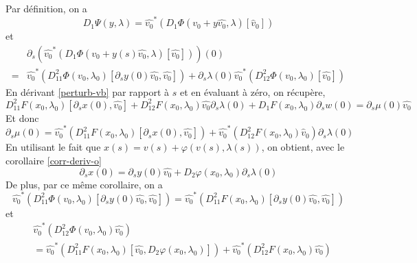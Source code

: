 \documentclass[memoire.tex]{subfiles}
\begin{document}
\begin{preuve}
    Par définition, on a
    \begin{equation*}
        D_1\Psi(y,\lambda)=\hat{v_0}^*(D_1\Phi(v_0+y\hat{v_0},\lambda)[\hat{v}_0])
    \end{equation*}
    et
    \begin{equation}\label{eq-dyn-1}    
        \begin{aligned}
            &\partial_s(\hat{v_0}^*(D_1\Phi(v_0+y(s)\hat{v_0},\lambda)[\hat{v_0}]))(0)\\
            =&\hat{v_0}^*(D^2_{11}\Phi(v_0,\lambda_0)[\partial_s y(0)\hat{v_0},\hat{v_0}])+\partial_s\lambda(0)\hat{v_0}^{*}(D^2_{12}\Phi(v_0,\lambda_0)[\hat{v_0}])
        \end{aligned}
    \end{equation} 
    En dérivant \eqref{perturb-vb} par rapport à $s$ et en évaluant à zéro, on récupère,
    \begin{equation}\label{eq-dyn-2}
        D^2_{11}F(x_0,\lambda_0)[\partial_s x(0),\hat{v_0}]+D^2_{12}F(x_0,\lambda_0)\hat{v_0}\partial_s\lambda(0)+D_1F(x_0,\lambda_0)\partial_sw(0)=\partial_s\mu (0)\hat{v_0}
    \end{equation}
    Et donc
    \begin{equation}\label{eq-dyn-3}
        \partial_s\mu(0)=\hat{v_0}^*(D^2_{11}F(x_0,\lambda_0)[\partial_sx(0),\hat{v_0}])+\hat{v_0}^*(D^2_{12}F(x_0,\lambda_0)\hat{v}_0)\partial_s\lambda(0)
    \end{equation}
    En utilisant le fait que $x(s)=v(s)+\varphi(v(s),\lambda(s))$, on obtient, avec le corollaire \ref{corr-deriv-o}
    \begin{equation}\label{eq-dyn-4}
        \partial_s x(0)=\partial_sy(0)\hat{v_0}+D_2\varphi(x_0,\lambda_0)\partial_s\lambda(0)
    \end{equation}
    De plus, par ce même corollaire, on a 
    \begin{equation}\label{eq-dyn-5}
        \hat{v_0}^*(D^2_{11}\Phi(v_0,\lambda_0)[\partial_sy(0)\hat{v_0},\hat{v_0}])=\hat{v_0}^*(D^2_{11}F(x_0,\lambda_0)[\partial_s y(0)\hat{v_0},\hat{v_0}])
    \end{equation}
    et
    \begin{equation}\label{eq-dyn-6}      
        \begin{aligned}
            &\hat{v_0}^*(D^2_{12}\Phi(v_0,\lambda_0)\hat{v_0})\\
            &=\hat{v_0}^*(D^2_{11}F(x_0,\lambda_0)[\hat{v_0},D_2\varphi(x_0,\lambda_0)])+\hat{v_0}^*(D^2_{12}F(x_0,\lambda_0)\hat{v_0})

\end{aligned}
\end{equation}
\end{preuve}
\end{document}
